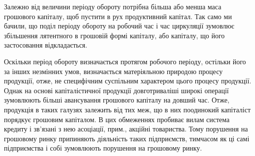 Залежно від величини періоду обороту потрібна більша або менша
маса грошового капіталу, щоб пустити в рух продуктивний капітал. Так
само ми бачили, що поділ періоду обороту на робочий час і час циркуляції
зумовлює збільшення лятентного в грошовій формі капіталу, або
капіталу, що його застосовання відкладається.

Оскільки період обороту визначається протягом робочого періоду, остільки
його за інших незмінних умов, визначається матеріяльною природою
процесу продукції, отже, не специфічним суспільним характером
цього процесу продукції. Однак на основі капіталістичної продукції довготриваліші
широкі операції зумовлюють більші авансування грошового
капіталу на довший час. Отже, продукція в таких галузях залежить від
тих меж, що в них поодинокий капіталіст порядкує грошовим капіталом.
В цих обмеженнях пробиває вилам система кредиту і зв’язані з нею асоціації,
прим., акційні товариства. Тому порушення на грошовому ринку
припиняють діяльність таких підприємств, тимчасом як ці самі підприємства
і собі зумовлюють порушення на грошовому ринку.

